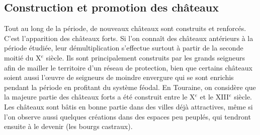 
\subsection{Construction et promotion des châteaux \label{meca-chateaux}}

Tout au long de la période, de nouveaux châteaux sont construits et renforcés. C'est l'apparition des \og châteaux forts\fg{}.
Si l'on connaît des châteaux antérieurs à la période étudiée, leur démultiplication s'effectue surtout à partir de la seconde moitié du X$^e$ siècle.
Ils sont principalement construits par les grands seigneurs afin de mailler le territoire d'un réseau de protection, bien que certains châteaux soient aussi l'œuvre de seigneurs de moindre envergure qui se sont enrichis pendant la période en profitant du système féodal.
En Touraine, on considère que la majeure partie des châteaux forts a été construit entre le X$^e$ et le XIII$^e$ siècle.
Les châteaux sont bâtis en bonne partie dans des villes déjà attractives, même si l'on observe aussi quelques créations dans des espaces peu peuplés, qui tendront ensuite à le devenir (les bourgs castraux).

